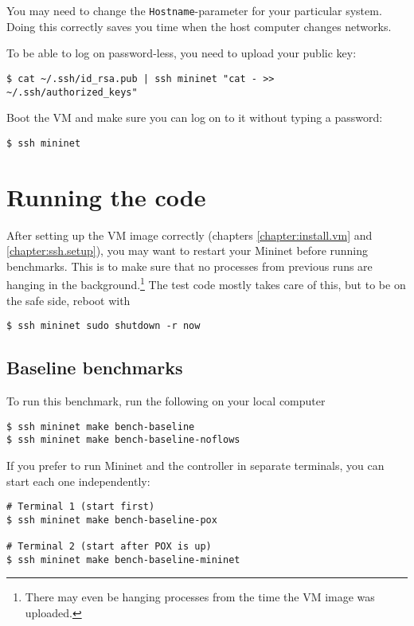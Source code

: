 You may need to change the \texttt{Hostname}-parameter for your particular
system.  Doing this correctly saves you time when the host computer changes
networks.

To be able to log on password-less, you need to upload your public key:

\begin{verbatim}
$ cat ~/.ssh/id_rsa.pub | ssh mininet "cat - >> ~/.ssh/authorized_keys"
\end{verbatim}

Boot the VM and make sure you can log on to it without typing a password:

\begin{verbatim}
$ ssh mininet
\end{verbatim}



\section{Running the code}
\label{chapter:appendix.benchmark}

After setting up the VM image correctly (chapters \ref{chapter:install.vm}
and \ref{chapter:ssh.setup}), you may want to restart your Mininet
before running benchmarks.  This is to make sure that no processes from
previous runs are hanging in the background.\footnote{There may even be
hanging processes from the time the VM image was uploaded.} The test code
mostly takes care of this, but to be on the safe side, reboot with

\begin{Verbatim}
$ ssh mininet sudo shutdown -r now
\end{Verbatim}

\subsection{Baseline benchmarks}
\label{chapter:appendix.baseline.benchmark}

To run this benchmark, run the following on your local computer

\begin{Verbatim}
$ ssh mininet make bench-baseline
$ ssh mininet make bench-baseline-noflows
\end{Verbatim}

If you prefer to run Mininet and the controller in separate terminals, you
can start each one independently:

\begin{Verbatim}
# Terminal 1 (start first)
$ ssh mininet make bench-baseline-pox

# Terminal 2 (start after POX is up)
$ ssh mininet make bench-baseline-mininet
\end{Verbatim}

